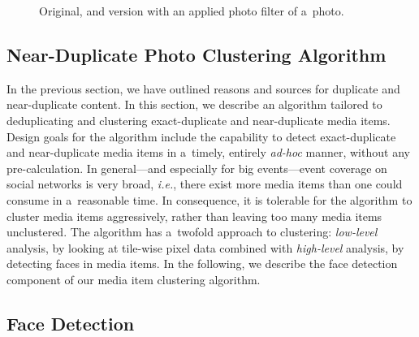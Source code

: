 \begin{figure}[h!]
  \centering
  \caption{Original, and version with an applied photo filter of a~photo.}
  \label{fig:photo-filter}  
\end{figure}

\subsection{Near-Duplicate Photo Clustering Algorithm}
\label{sec:near-duplicate-clustering-algorithm}

In the previous section, we have outlined
reasons and sources for duplicate and near-duplicate content.
In this section, we describe an algorithm tailored to
deduplicating and clustering exact-duplicate and near-duplicate media items.
Design goals for the algorithm include
the capability to detect exact-duplicate and near-duplicate media items
in a~timely, entirely \emph{ad-hoc} manner, without any pre-calculation.
In general---and especially for big events---event coverage on social networks
is very broad, \emph{i.e.}, there exist more media items
than one could consume in a~reasonable time.
In consequence, it is tolerable for the algorithm to cluster media items aggressively,
rather than leaving too many media items unclustered.
The algorithm has a~twofold approach to clustering:
\emph{low-level} analysis, by looking at tile-wise pixel data
combined with \emph{high-level} analysis, by detecting faces in media items.
In the following, we describe the face detection component
of our media item clustering algorithm.

\subsection{Face Detection}
\label{sec:face-detection}

